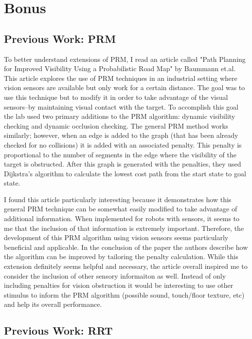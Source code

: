 \documentclass{article}
\begin{document}
\section{Bonus}
\subsection{Previous Work: PRM}
To better understand extensions of PRM, I read an article called "Path Planning for Improved Visibility Using a Probabilistic Road Map" by Baummann et.al. This article explores the use of PRM techniques in an industrial setting where vision sensors are available but only work for a certain distance. The goal was to use this technique but to modify it in order to take advantage of the visual sensors--by maintaining visual contact with the target. To accomplish this goal the lab used two primary additions to the PRM algorithm: dynamic visibility checking and dynamic occlusion checking. The general PRM method works similarly; however, when an edge is added to the graph (that has been already checked for no collisions) it is added with an associated penalty. This penalty is proportional to the number of segments in the edge where the visibility of the target is obstructed. After this graph is generated with the penalties, they used Dijkstra's algorithm to calculate the lowest cost path from the start state to goal state.

I found this article particularly interesting because it demonstrates how this general PRM technique can be somewhat easily modified to take advantage of additional information. When implemented for robots with sensors, it seems to me that the inclusion of that information is extremely important. Therefore, the development of this PRM algorithm using vision sensors seems particularly beneficial and applicable. In the conclusion of the paper the authors describe how the algorithm can be improved by tailoring the penalty calculation. While this extension definitely seems helpful and necessary, the article overall inspired me to consider the inclusion of other sensory informaiton as well. Instead of only including penalties for vision obstruction it would be interesting to use other stimulus to inform the PRM algorithm (possible sound, touch/floor texture, etc) and help its overall performance.

\subsection{Previous Work: RRT}
\end{document}
